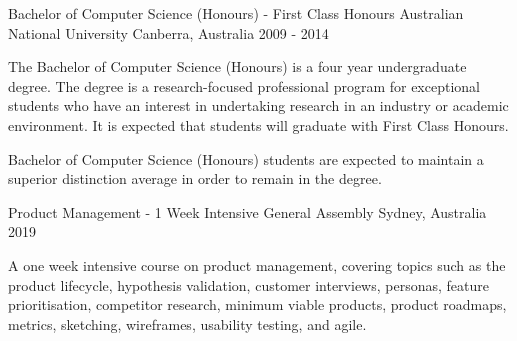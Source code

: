 


\begin{cventries}


\cventry
{Bachelor of Computer Science (Honours) - First Class Honours} %
{Australian National University} %
{Canberra, Australia} %
{2009 - 2014} %
{ %
\begin{cvitems}
\item {The Bachelor of Computer Science (Honours) is a four year undergraduate degree. The degree is a research-focused professional program for exceptional students who have an interest in undertaking research in an industry or academic environment. It is expected that students will graduate with First Class Honours.}
\item {Bachelor of Computer Science (Honours) students are expected to maintain a superior distinction average in order to remain in the degree.}
\end{cvitems}
}

\cventry
{Product Management - 1 Week Intensive} %
{General Assembly} %
{Sydney, Australia} %
{2019} %
{ %
\begin{cvitems}
\item {
  A one week intensive course on product management, covering topics such as the product lifecycle, hypothesis validation, customer interviews, personas, feature prioritisation, competitor research, minimum viable products, product roadmaps, metrics, sketching, wireframes, usability testing, and agile.
}
\end{cvitems}
}


\end{cventries}